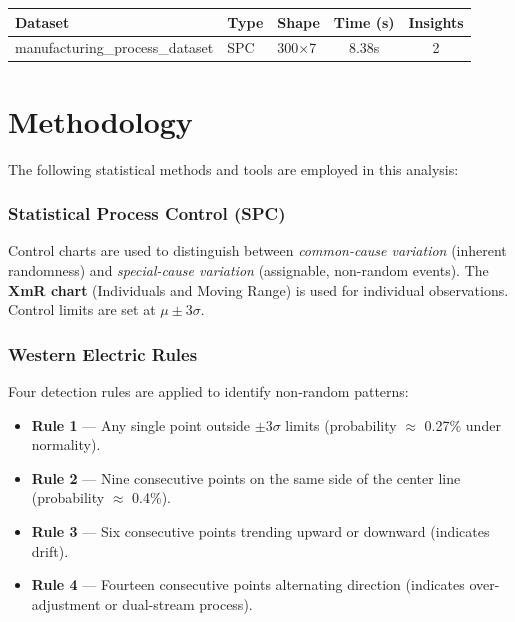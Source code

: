 \documentclass[12pt,a4paper]{article}
\begin{document}
\begin{center}
\begin{tabular}{lllcc}
\toprule
\textbf{Dataset} & \textbf{Type} & \textbf{Shape} & \textbf{Time (s)} & \textbf{Insights} \\
\midrule
  manufacturing\_process\_dataset & SPC & 300\(\times\)7 & 8.38s & 2\\
\bottomrule
\end{tabular}
\end{center}

\newpage

\section{Methodology}


The following statistical methods and tools are employed in this analysis:

\subsubsection*{Statistical Process Control (SPC)}

Control charts are used to distinguish between \textit{common-cause variation}
(inherent randomness) and \textit{special-cause variation} (assignable, non-random
events). The \textbf{XmR chart} (Individuals and Moving Range) is used for
individual observations. Control limits are set at $\mu \pm 3\sigma$.

\subsubsection*{Western Electric Rules}

Four detection rules are applied to identify non-random patterns:

\begin{itemize}[leftmargin=2em]
  \item \textbf{Rule 1} — Any single point outside $\pm 3\sigma$ limits
        (probability $\approx$ 0.27\% under normality).
  \item \textbf{Rule 2} — Nine consecutive points on the same side of the
        center line (probability $\approx$ 0.4\%).
  \item \textbf{Rule 3} — Six consecutive points trending upward or downward
        (indicates drift).
  \item \textbf{Rule 4} — Fourteen consecutive points alternating direction
        (indicates over-adjustment or dual-stream process).
\end{itemize}
\end{document}
